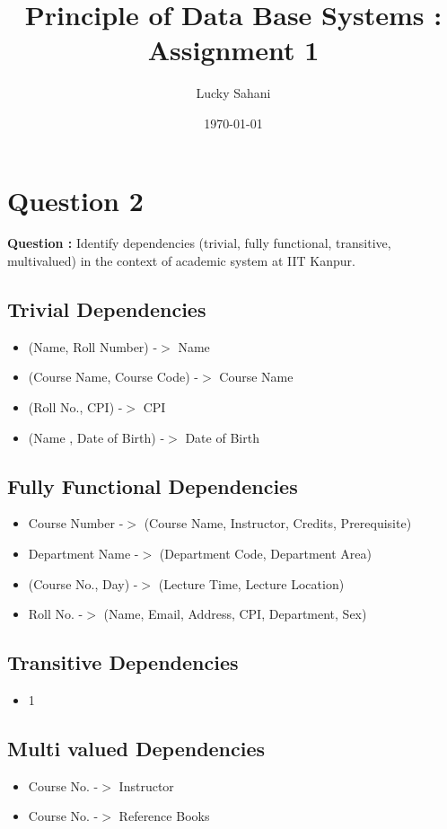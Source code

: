 \documentclass[a4paper]{article}
\title{Principle of Data Base Systems : Assignment 1}
\date{\today}
\author{Lucky Sahani}
\begin{document}
\maketitle

\section{Question 2}
\label{sec:q1}
{\bf Question :} Identify dependencies (trivial, fully functional, transitive, multivalued) in the context of  academic system at IIT Kanpur. 
\subsection{Trivial Dependencies}
\begin{itemize}
\item (Name, Roll Number) -$>$ Name
\item (Course Name, Course Code) -$>$ Course Name
\item (Roll No., CPI) -$>$ CPI
\item (Name , Date of Birth) -$>$ Date of Birth
\end{itemize}

\subsection{Fully Functional Dependencies}
\begin{itemize}
\item Course Number -$>$ (Course Name, Instructor, Credits, Prerequisite)
\item Department Name -$>$ (Department Code, Department Area)
\item (Course No., Day) -$>$ (Lecture Time, Lecture Location)
\item Roll No. -$>$ (Name, Email, Address, CPI, Department, Sex)
\end{itemize}

\subsection{Transitive Dependencies}
\begin{itemize}
\item 1
\end{itemize}

\subsection{Multi valued Dependencies}
\begin{itemize}
\item Course No. -$>$ Instructor
\item Course No. -$>$ Reference Books
\end{itemize}
\end{document}
